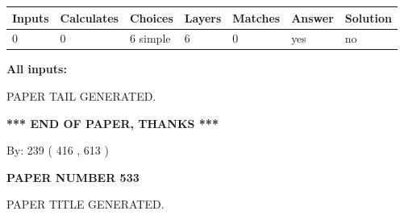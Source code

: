 \documentclass{ctexart}
\begin{document}
 
   
   
   
   
\noindent\begin{tabular}{|l|l|l|l|l|l|l|}
 \hline
Inputs & Calculates & Choices & Layers & Matches & Answer & Solution \\ \hline
 0  & 
 0  & 
 6
  simple  
  & 
 6  & 
 0  & 
  yes & 
  no 
  \\ \hline
 \end{tabular}
   
   
   
   
\noindent{}
   
   
   
   
\noindent\vspace{0.1in}\hspace{-0.08in} {\textbf{\Large{All inputs: }}}
   
   
   
   
   
   
 \vspace{0.2in}
 
   
   
\vspace{2.0in} PAPER TAIL GENERATED.
   
   
   
   
\vspace{1.0in} 
{\textbf{\large{ *** END OF PAPER, THANKS *** }}} 
   
   
\hspace{1.0in} By: 
 239 ( 416 ,  613 )
   
   
   
   
\newpage 
\setcounter{page}{ 
   533001 } 
   
   
   
   
 {\textbf{ \Large{ PAPER NUMBER  533  }}}
   
   
\vspace{0.2in}
   
   
   
   
   
   
   
   
 \vspace{0.2in}
 
 
 
 
   
   
 PAPER TITLE GENERATED.
   
\end{document}
